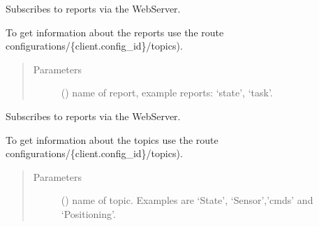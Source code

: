 \documentclass[letterpaper,10pt,english,openany,oneside]{sphinxmanual}
\begin{document}
\begin{fulllineitems}
\begin{fulllineitems}
\begin{quote}
\begin{description}
\end{description}\end{quote}

\end{fulllineitems}


\begin{fulllineitems}
\label{\detokenize{_modules/AconitySTUDIO_client:AconitySTUDIO_client.AconitySTUDIO_client.subscribe_report}}
Subscribes to reports via the WebServer.

To get information about the reports use the route configurations/\{client.config\_id\}/topics).
\begin{quote}\begin{description}
\item[{Parameters}] \leavevmode
{} () \textendash{} name of report, example reports: ‘state’, ‘task’.

\end{description}\end{quote}

\end{fulllineitems}


\begin{fulllineitems}
\label{\detokenize{_modules/AconitySTUDIO_client:AconitySTUDIO_client.AconitySTUDIO_client.subscribe_topic}}
Subscribes to reports via the WebServer.

To get information about the topics use the route configurations/\{client.config\_id\}/topics).
\begin{quote}\begin{description}
\item[{Parameters}] \leavevmode
{} () \textendash{} name of topic. Examples are ‘State’, ‘Sensor’,’cmds’ and ‘Positioning’.

\end{description}\end{quote}

\end{fulllineitems}


\end{fulllineitems}
\end{document}
